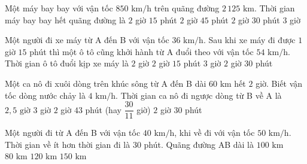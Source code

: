 \begin{ex} %
Một máy bay bay với vận tốc $850\text{ km/h}$ trên quãng đường $2\,125\text{ km}$. Thời gian máy bay bay hết quãng đường là
\choice
{$2$ giờ $15$ phút}
{$2$ giờ $45$ phút}
{\True $2$ giờ $30$ phút}
{$3$ giờ}
\end{ex}

\begin{ex} %
Một người đi xe máy từ A đến B với vận tốc $36\text{ km/h}$. Sau khi xe máy đi được $1$ giờ $15$ phút thì một ô tô cũng khởi hành từ A đuổi theo với vận tốc $54\text{ km/h}$. Thời gian ô tô đuổi kịp xe máy là
\choice
{$2$ giờ}
{$2$ giờ $15$ phút}
{$3$ giờ}
{\True $2$ giờ $30$ phút}
\end{ex}

\begin{ex} %
Một ca nô đi xuôi dòng trên khúc sông từ A đến B dài $60\text{ km}$ hết $2$ giờ. Biết vận tốc dòng nước chảy là $4\text{ km/h}$. Thời gian ca nô đi ngược dòng từ B về A là
\choice
{$2{,}5\text{ giờ}$}
{$3$ giờ}
{\True $2$ giờ $43$ phút (hay $\dfrac{30}{11}$ giờ)}
{$2$ giờ $30$ phút}
\end{ex}

\begin{ex} %
Một người đi từ A đến B với vận tốc $40\text{ km/h}$, khi về đi với vận tốc $50\text{ km/h}$. Thời gian về ít hơn thời gian đi là $30$ phút. Quãng đường AB dài là
\choice
{\True $100\text{ km}$}
{$80\text{ km}$}
{$120\text{ km}$}
{$150\text{ km}$}
\end{ex}

